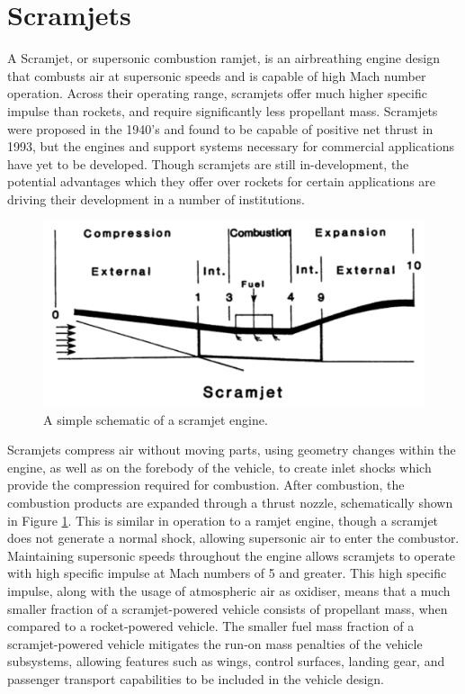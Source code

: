  
    
    \section{Scramjets}
    
    A Scramjet, or supersonic combustion ramjet, is an airbreathing engine design that combusts air at supersonic speeds and is capable of high Mach number operation. 
    Across their operating range, scramjets offer much higher specific impulse than rockets, and require significantly less propellant mass\cite{Billig1993,Cook2003}.
    Scramjets were proposed in the 1940's\cite{Curran2001} and found to be capable of positive net thrust in 1993\cite{Paull1993}, but the engines and support systems necessary for commercial applications have yet to be developed. 
    Though scramjets are still in-development, the potential advantages which they offer over rockets for certain applications are driving their development in a number of institutions\cite{Curran2001b}.
    \begin{figure}[ht]
    	\centering
    	\includegraphics[width=0.7\linewidth]{figures/2_literature-review/scramjet}
    	\caption{A simple schematic of a scramjet engine\cite{Heiser1994}.}
    	\label{fig:scramjet}
    \end{figure}
    
    Scramjets compress air without moving parts, using geometry changes within the engine\cite{Curran2001a}, as well as on the forebody of the vehicle, to create inlet shocks which provide the compression required for combustion\cite{Smart2012}. After combustion, the combustion products are expanded through a thrust nozzle, schematically shown in Figure \ref{fig:scramjet}. This is similar in operation to a ramjet engine, though a scramjet does not generate a normal shock, allowing supersonic air to enter the combustor. Maintaining supersonic speeds throughout the engine allows scramjets to operate with high specific impulse at Mach numbers of 5 and greater. This high specific impulse, along with the usage of atmospheric air as oxidiser, means that a much smaller fraction of a scramjet-powered vehicle consists of propellant mass, when compared to a rocket-powered vehicle\cite{Curran2003}. The smaller fuel mass fraction of a scramjet-powered vehicle mitigates the run-on mass penalties of the vehicle subsystems, allowing features such as wings, control surfaces, landing gear, and passenger transport capabilities to be included in the vehicle design\cite{Curran2003}.  
    
